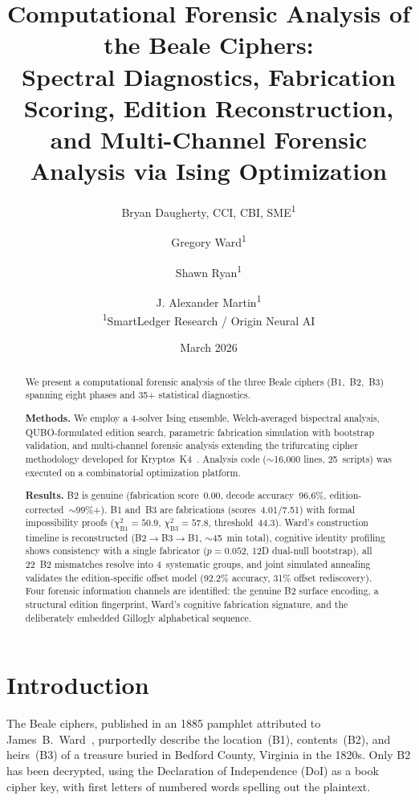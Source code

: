 \documentclass[11pt,a4paper]{article}
\title{%
    \textbf{Computational Forensic Analysis of the Beale Ciphers:}\\[6pt]
    \Large Spectral Diagnostics, Fabrication Scoring, Edition Reconstruction,\\
    and Multi-Channel Forensic Analysis via Ising Optimization
}
\author{
    Bryan Daugherty, CCI, CBI, SME\textsuperscript{1}
    \and
    Gregory Ward\textsuperscript{1}
    \and
    Shawn Ryan\textsuperscript{1}
    \and
    J. Alexander Martin\textsuperscript{1}
    \\[6pt]
    \textsuperscript{1}SmartLedger Research / Origin Neural AI
}
\date{March 2026}
\begin{document}
\maketitle

\begin{abstract}
We present a computational forensic analysis of the three Beale ciphers
(B1,~B2,~B3) spanning eight phases and 35+ statistical diagnostics.

\textbf{Methods.}
We employ a 4-solver Ising ensemble, Welch-averaged bispectral analysis,
QUBO-formulated edition search, parametric fabrication simulation with
bootstrap validation, and multi-channel forensic analysis extending the
trifurcating cipher methodology developed for Kryptos~K4~\cite{daugherty2026k4}.
Analysis code ($\sim$16{,}000 lines, 25~scripts) was executed on a
combinatorial optimization platform.

\textbf{Results.}
B2 is genuine (fabrication score~0.00, decode accuracy~96.6\%,
edition-corrected~$\sim$99\%+). B1 and~B3 are fabrications
(scores~4.01/7.51) with formal impossibility proofs
($\chi^2_{\text{B1}}{=}50.9$, $\chi^2_{\text{B3}}{=}57.8$, threshold~44.3).
Ward's construction timeline is reconstructed (B2$\to$B3$\to$B1,
$\sim$45~min total), cognitive identity profiling shows consistency
with a single fabricator ($p{=}0.052$, 12D dual-null bootstrap), all 22~B2 mismatches resolve into
4~systematic groups, and joint simulated annealing validates the
edition-specific offset model (92.2\% accuracy, 31\% offset rediscovery).
Four forensic information channels are identified: the genuine B2
surface encoding, a structural edition fingerprint, Ward's cognitive
fabrication signature, and the deliberately embedded Gillogly
alphabetical sequence.
\end{abstract}

\section{Introduction}

The Beale ciphers, published in an 1885 pamphlet attributed to
James~B.~Ward~\cite{ward1885}, purportedly describe the location~(B1),
contents~(B2), and heirs~(B3) of a treasure buried in Bedford County,
Virginia in the 1820s. Only B2 has been decrypted, using the Declaration
of Independence (DoI) as a book cipher key, with first letters of
numbered words spelling out the plaintext.
\end{document}
